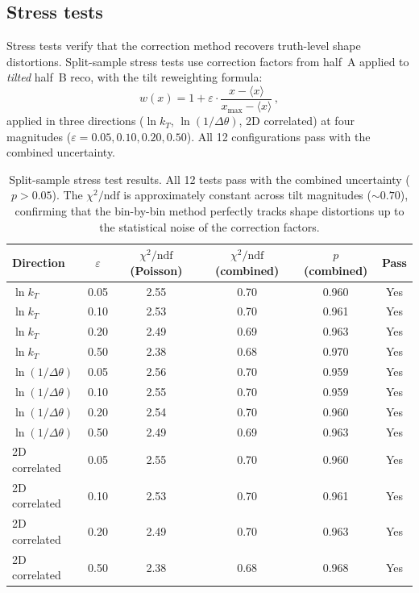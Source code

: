 \documentclass[11pt,a4paper]{article}
\begin{document}
\subsection{Stress tests}
\label{sec:stress}

Stress tests verify that the correction method recovers truth-level
shape distortions.  Split-sample stress tests use correction factors
from half~A applied to \emph{tilted} half~B reco, with the tilt
reweighting formula:
\begin{equation}
  w(x) = 1 + \varepsilon \cdot \frac{x - \langle x \rangle}
  {x_\text{max} - \langle x \rangle}\,,
  \label{eq:stress-tilt}
\end{equation}
applied in three directions ($\ln k_T$, $\ln(1/\Delta\theta)$,
2D correlated) at four magnitudes ($\varepsilon = 0.05, 0.10, 0.20,
0.50$).  All 12 configurations pass with the combined uncertainty.

\begin{table}[htbp]
\centering
\caption{Split-sample stress test results.  All 12 tests pass
  with the combined uncertainty ($p > 0.05$).  The $\chi^2/\text{ndf}$
  is approximately constant across tilt magnitudes ($\sim\!0.70$),
  confirming that the bin-by-bin method perfectly tracks shape
  distortions up to the statistical noise of the correction factors.}
\label{tbl:stress}
\begin{tabular}{lccccc}
\toprule
Direction & $\varepsilon$ & $\chi^2/\text{ndf}$ (Poisson) &
  $\chi^2/\text{ndf}$ (combined) & $p$ (combined) & Pass \\
\midrule
$\ln k_T$ & 0.05 & 2.55 & 0.70 & 0.960 & Yes \\
$\ln k_T$ & 0.10 & 2.53 & 0.70 & 0.961 & Yes \\
$\ln k_T$ & 0.20 & 2.49 & 0.69 & 0.963 & Yes \\
$\ln k_T$ & 0.50 & 2.38 & 0.68 & 0.970 & Yes \\
$\ln(1/\Delta\theta)$ & 0.05 & 2.56 & 0.70 & 0.959 & Yes \\
$\ln(1/\Delta\theta)$ & 0.10 & 2.55 & 0.70 & 0.959 & Yes \\
$\ln(1/\Delta\theta)$ & 0.20 & 2.54 & 0.70 & 0.960 & Yes \\
$\ln(1/\Delta\theta)$ & 0.50 & 2.49 & 0.69 & 0.963 & Yes \\
2D correlated & 0.05 & 2.55 & 0.70 & 0.960 & Yes \\
2D correlated & 0.10 & 2.53 & 0.70 & 0.961 & Yes \\
2D correlated & 0.20 & 2.49 & 0.70 & 0.963 & Yes \\
2D correlated & 0.50 & 2.38 & 0.68 & 0.968 & Yes \\
\bottomrule
\end{tabular}
\end{table}
\end{document}
